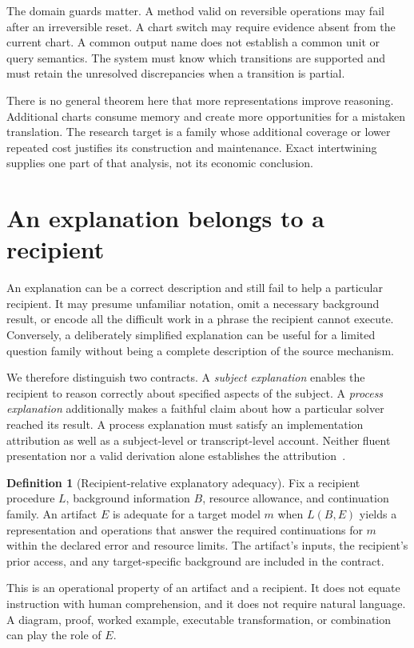 \documentclass[11pt,letterpaper]{article}
\theoremstyle{plain}
\theoremstyle{definition}
\newtheorem{definition}[theorem]{Definition}
\begin{document}
The domain guards matter. A method valid on reversible operations may fail after an irreversible reset. A chart switch may require evidence absent from the current chart. A common output name does not establish a common unit or query semantics. The system must know which transitions are supported and must retain the unresolved discrepancies when a transition is partial.

There is no general theorem here that more representations improve reasoning. Additional charts consume memory and create more opportunities for a mistaken translation. The research target is a family whose additional coverage or lower repeated cost justifies its construction and maintenance. Exact intertwining supplies one part of that analysis, not its economic conclusion.

\section{An explanation belongs to a recipient}\label{sec:explanation}
An explanation can be a correct description and still fail to help a particular recipient. It may presume unfamiliar notation, omit a necessary background result, or encode all the difficult work in a phrase the recipient cannot execute. Conversely, a deliberately simplified explanation can be useful for a limited question family without being a complete description of the source mechanism.

We therefore distinguish two contracts. A \emph{subject explanation} enables the recipient to reason correctly about specified aspects of the subject. A \emph{process explanation} additionally makes a faithful claim about how a particular solver reached its result. A process explanation must satisfy an implementation attribution as well as a subject-level or transcript-level account. Neither fluent presentation nor a valid derivation alone establishes the attribution~\cite{jacovi}.

\begin{definition}[Recipient-relative explanatory adequacy]\label{def:explanation}
Fix a recipient procedure $L$, background information $B$, resource allowance, and continuation family. An artifact $E$ is adequate for a target model $m$ when $L(B,E)$ yields a representation and operations that answer the required continuations for $m$ within the declared error and resource limits. The artifact's inputs, the recipient's prior access, and any target-specific background are included in the contract.
\end{definition}
This is an operational property of an artifact and a recipient. It does not equate instruction with human comprehension, and it does not require natural language. A diagram, proof, worked example, executable transformation, or combination can play the role of $E$.
\end{document}
